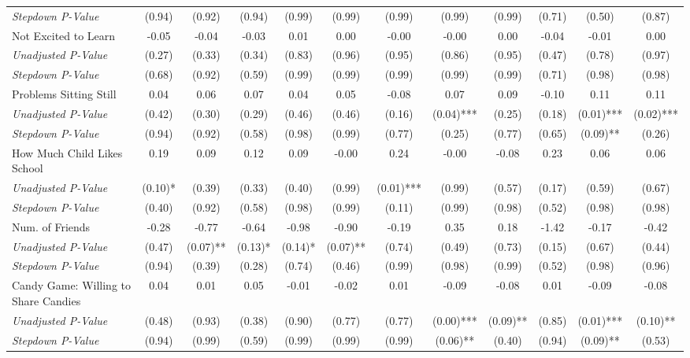 \begin{tabular}{l c c c c c c c c c c c}
\quad \textit{Stepdown P-Value} & (0.94) & (0.92) & (0.94) & (0.99) & (0.99) & (0.99) & (0.99) & (0.99) & (0.71) & (0.50) & (0.87) \\
Not Excited to Learn & -0.05 & -0.04 & -0.03 & 0.01 & 0.00 & -0.00 & -0.00 & 0.00 & -0.04 & -0.01 & 0.00 \\
\quad \textit{Unadjusted P-Value} & (0.27) & (0.33) & (0.34) & (0.83) & (0.96) & (0.95) & (0.86) & (0.95) & (0.47) & (0.78) & (0.97) \\
\quad \textit{Stepdown P-Value} & (0.68) & (0.92) & (0.59) & (0.99) & (0.99) & (0.99) & (0.99) & (0.99) & (0.71) & (0.98) & (0.98) \\
Problems Sitting Still & 0.04 & 0.06 & 0.07 & 0.04 & 0.05 & -0.08 & 0.07 & 0.09 & -0.10 & 0.11 & 0.11 \\
\quad \textit{Unadjusted P-Value} & (0.42) & (0.30) & (0.29) & (0.46) & (0.46) & (0.16) & (0.04)*** & (0.25) & (0.18) & (0.01)*** & (0.02)*** \\
\quad \textit{Stepdown P-Value} & (0.94) & (0.92) & (0.58) & (0.98) & (0.99) & (0.77) & (0.25) & (0.77) & (0.65) & (0.09)** & (0.26) \\
How Much Child Likes School & 0.19 & 0.09 & 0.12 & 0.09 & -0.00 & 0.24 & -0.00 & -0.08 & 0.23 & 0.06 & 0.06 \\
\quad \textit{Unadjusted P-Value} & (0.10)* & (0.39) & (0.33) & (0.40) & (0.99) & (0.01)*** & (0.99) & (0.57) & (0.17) & (0.59) & (0.67) \\
\quad \textit{Stepdown P-Value} & (0.40) & (0.92) & (0.58) & (0.98) & (0.99) & (0.11) & (0.99) & (0.98) & (0.52) & (0.98) & (0.98) \\
Num. of Friends & -0.28 & -0.77 & -0.64 & -0.98 & -0.90 & -0.19 & 0.35 & 0.18 & -1.42 & -0.17 & -0.42 \\
\quad \textit{Unadjusted P-Value} & (0.47) & (0.07)** & (0.13)* & (0.14)* & (0.07)** & (0.74) & (0.49) & (0.73) & (0.15) & (0.67) & (0.44) \\
\quad \textit{Stepdown P-Value} & (0.94) & (0.39) & (0.28) & (0.74) & (0.46) & (0.99) & (0.98) & (0.99) & (0.52) & (0.98) & (0.96) \\
Candy Game: Willing to Share Candies & 0.04 & 0.01 & 0.05 & -0.01 & -0.02 & 0.01 & -0.09 & -0.08 & 0.01 & -0.09 & -0.08 \\
\quad \textit{Unadjusted P-Value} & (0.48) & (0.93) & (0.38) & (0.90) & (0.77) & (0.77) & (0.00)*** & (0.09)** & (0.85) & (0.01)*** & (0.10)** \\
\quad \textit{Stepdown P-Value} & (0.94) & (0.99) & (0.59) & (0.99) & (0.99) & (0.99) & (0.06)** & (0.40) & (0.94) & (0.09)** & (0.53) \\
\bottomrule
\end{tabular}

